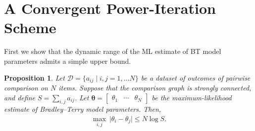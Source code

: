 \documentclass[12pt,a4paper,oneside]{article}
\theoremstyle{plain}
\newtheorem{proposition}{Proposition}
\begin{document}
\section{A Convergent Power-Iteration Scheme}

First we show that the dynamic range of the ML estimate of BT model parameters admits a simple upper bound.

\begin{proposition}
Let $\mathcal{D} = \{ a_{ij} \mid i, j = 1, \ldots N \}$ be a dataset of outcomes of pairwise comparison on $N$ items.
Suppose that the comparison graph is strongly connected, and define $S = \sum_{i, j} a_{ij}$.
Let $\bm{\theta} = \begin{bmatrix}\theta_1 & \cdots & \theta_N \end{bmatrix}$ be the maximum-likelihood estimate of Bradley--Terry model parameters.
Then,
\begin{align*}
\max_{i, j} \ \lvert \theta_i - \theta_j \rvert \le N \log S.
\end{align*}
\end{proposition}
\end{document}
